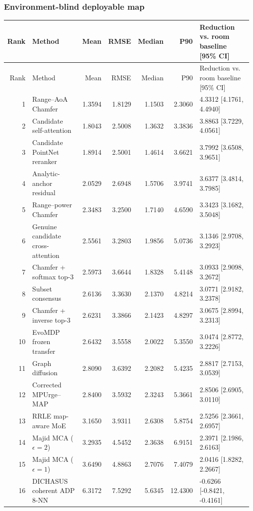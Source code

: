 \subsubsection{Environment-blind deployable map}
\begingroup\scriptsize\setlength{\tabcolsep}{3.2pt}
\begin{longtable}{@{}r p{.28\linewidth} r r r r p{.23\linewidth}@{}}
\toprule Rank & Method & Mean & RMSE & Median & P90 & Reduction vs. room baseline [95\% CI] \\
\midrule\endfirsthead
\toprule Rank & Method & Mean & RMSE & Median & P90 & Reduction vs. room baseline [95\% CI] \\
\midrule\endhead
1 & Range--AoA Chamfer & 1.3594 & 1.8129 & 1.1503 & 2.3060 & 4.3312 [4.1761, 4.4940] \\
2 & Candidate self-attention & 1.8043 & 2.5008 & 1.3632 & 3.3836 & 3.8863 [3.7229, 4.0561] \\
3 & Candidate PointNet reranker & 1.8914 & 2.5001 & 1.4614 & 3.6621 & 3.7992 [3.6508, 3.9651] \\
4 & Analytic-anchor residual & 2.0529 & 2.6948 & 1.5706 & 3.9741 & 3.6377 [3.4814, 3.7985] \\
5 & Range--power Chamfer & 2.3483 & 3.2500 & 1.7140 & 4.6590 & 3.3423 [3.1682, 3.5048] \\
6 & Genuine candidate cross-attention & 2.5561 & 3.2803 & 1.9856 & 5.0736 & 3.1346 [2.9708, 3.2923] \\
7 & Chamfer + softmax top-3 & 2.5973 & 3.6644 & 1.8328 & 5.4148 & 3.0933 [2.9098, 3.2672] \\
8 & Subset consensus & 2.6136 & 3.3630 & 2.1370 & 4.8214 & 3.0771 [2.9182, 3.2378] \\
9 & Chamfer + inverse top-3 & 2.6231 & 3.3866 & 2.1423 & 4.8297 & 3.0675 [2.8994, 3.2313] \\
10 & EvoMDP frozen transfer & 2.6432 & 3.5558 & 2.0022 & 5.3550 & 3.0474 [2.8772, 3.2226] \\
11 & Graph diffusion & 2.8090 & 3.6392 & 2.2082 & 5.4235 & 2.8817 [2.7153, 3.0539] \\
12 & Corrected MPUrge--MAP & 2.8400 & 3.5932 & 2.3243 & 5.3661 & 2.8506 [2.6905, 3.0110] \\
13 & RRLE map-aware MoE & 3.1650 & 3.9311 & 2.6308 & 5.8754 & 2.5256 [2.3661, 2.6957] \\
14 & Majid MCA ($\epsilon=2$) & 3.2935 & 4.5452 & 2.3638 & 6.9151 & 2.3971 [2.1986, 2.6163] \\
15 & Majid MCA ($\epsilon=1$) & 3.6490 & 4.8863 & 2.7076 & 7.4079 & 2.0416 [1.8282, 2.2667] \\
16 & DICHASUS coherent ADP 8-NN & 6.3172 & 7.5292 & 5.6345 & 12.4300 & -0.6266 [-0.8421, -0.4161] \\
\bottomrule
\end{longtable}\endgroup
